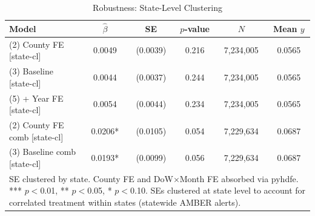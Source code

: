 \begin{table}[htbp]\centering
\caption{Robustness: State-Level Clustering}
\begin{tabular}{lccccc}
\hline\hline
Model & $\hat\beta$ & SE & $p$-value & $N$ & Mean $y$ \\
\midrule
(2) County FE [state-cl] & 0.0049 & (0.0039) & 0.216 & 7,234,005 & 0.0565 \\
(3) Baseline [state-cl] & 0.0044 & (0.0037) & 0.244 & 7,234,005 & 0.0565 \\
(5) + Year FE [state-cl] & 0.0054 & (0.0044) & 0.234 & 7,234,005 & 0.0565 \\
(2) County FE comb [state-cl] & 0.0206* & (0.0105) & 0.054 & 7,229,634 & 0.0687 \\
(3) Baseline comb [state-cl] & 0.0193* & (0.0099) & 0.056 & 7,229,634 & 0.0687 \\
\hline\hline
\multicolumn{6}{p{0.9\textwidth}}{\footnotesize SE clustered by state. County FE and DoW$\times$Month FE absorbed via pyhdfe. *** $p{<}$0.01, ** $p{<}$0.05, * $p{<}$0.10. SEs clustered at state level to account for correlated treatment within states (statewide AMBER alerts).} \\
\end{tabular}
\end{table}